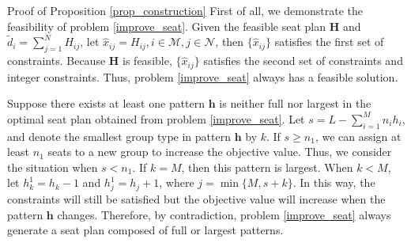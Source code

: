 \begin{pf}{Proof of Proposition \ref{prop_construction}}
  First of all, we demonstrate the feasibility of problem \eqref{improve_seat}. Given the feasible seat plan $\bm{H}$ and $\tilde{d}_{i} = \sum_{j=1}^{N} H_{ij}$, let $\hat{x}_{ij} = H_{ij}, i \in \mathcal{M}, j \in \mathcal{N}$, then $\{\hat{x}_{ij}\}$ satisfies the first set of constraints. Because $\bm{H}$ is feasible, $\{\hat{x}_{ij}\}$ satisfies the second set of constraints and integer constraints. Thus, problem \eqref{improve_seat} always has a feasible solution. 
  
  Suppose there exists at least one pattern $\bm{h}$ is neither full nor largest in the optimal seat plan obtained from problem \eqref{improve_seat}. Let $s = L - \sum_{i=1}^{M} n_{i} h_{i}$, and denote the smallest group type in pattern $\bm{h}$ by $k$. If $s \geq n_1$, we can assign at least $n_1$ seats to a new group to increase the objective value. Thus, we consider the situation when $s < n_1$. If $k =M$, then this pattern is largest. When $k< M$, let $h^{1}_{k} = h_{k} -1$ and $h^{1}_{j} = h_{j} +1$, where $j = \min\{M, s + k\}$. In this way, the constraints will still be satisfied but the objective value will increase when the pattern $\bm{h}$ changes. Therefore, by contradiction, problem \eqref{improve_seat} always generate a seat plan composed of full or largest patterns.
\end{pf}


